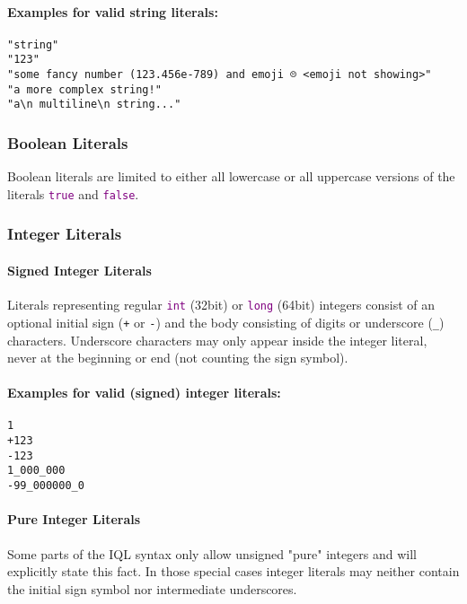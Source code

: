 \documentclass[11pt]{article}
\newcommand{\iql}{IQL\xspace}
\newcommand{\keyword}[1]{\textcolor{purple}{\texttt{#1}}}
\begin{document}
\paragraph{Examples for valid string literals:}

\begin{verbatim}
"string"
"123"
"some fancy number (123.456e-789) and emoji ☹ <emoji not showing>"
"a more complex string!"
"a\n multiline\n string..."
\end{verbatim}

\subsubsection{Boolean Literals}
\label{sec:boolean-literals}

Boolean literals are limited to either all lowercase or all uppercase versions of the literals \keyword{true} and \keyword{false}.

\subsubsection{Integer Literals}
\label{sec:integer-literals}

\paragraph{Signed Integer Literals}
Literals representing regular \keyword{int} (32bit) or \keyword{long} (64bit) integers consist of an optional initial sign (\texttt{+} or \texttt{-}) and the body consisting of digits or underscore (\texttt{\_}) characters.
Underscore characters may only appear inside the integer literal, never at the beginning or end (not counting the sign symbol).

\paragraph{Examples for valid (signed) integer literals:}

\begin{verbatim}
1
+123
-123
1_000_000
-99_000000_0
\end{verbatim}

\paragraph{Pure Integer Literals}
Some parts of the \iql syntax only allow unsigned "pure" integers and will explicitly state this fact. In those special cases integer literals may neither contain the initial sign symbol nor intermediate underscores.
\end{document}
